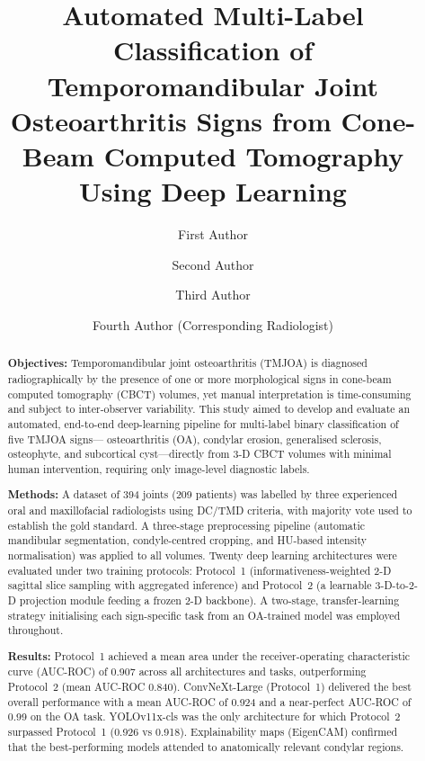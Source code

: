 \documentclass[review,12pt]{elsarticle}
\begin{document}
\begin{frontmatter}

\title{Automated Multi-Label Classification of Temporomandibular Joint
Osteoarthritis Signs from Cone-Beam Computed Tomography Using Deep
Learning}

\author[muid]{First Author}

\author[muid]{Second Author}
\author[muid]{Third Author}
\author[muid]{Fourth Author (Corresponding Radiologist)}


\address[muid]{Department of Oral and Maxillofacial Radiology,
Faculty of Dentistry, Mahidol University, Bangkok, Thailand}

\begin{abstract}
\textbf{Objectives:}
Temporomandibular joint osteoarthritis (TMJOA) is diagnosed
radiographically by the presence of one or more morphological signs in
cone-beam computed tomography (CBCT) volumes, yet manual interpretation
is time-consuming and subject to inter-observer variability. This study
aimed to develop and evaluate an automated, end-to-end deep-learning
pipeline for multi-label binary classification of five TMJOA signs---
osteoarthritis (OA), condylar erosion, generalised sclerosis, osteophyte,
and subcortical cyst---directly from 3-D CBCT volumes with minimal human intervention, requiring only image-level diagnostic labels.

\textbf{Methods:}
A dataset of 394 joints (209 patients) was labelled by three experienced
oral and maxillofacial radiologists using DC/TMD criteria, with majority
vote used to establish the gold standard. A three-stage preprocessing
pipeline (automatic mandibular segmentation, condyle-centred cropping, and
HU-based intensity normalisation) was applied to all volumes. Twenty deep
learning architectures were evaluated under two training protocols:
Protocol~1 (informativeness-weighted 2-D sagittal slice sampling with
aggregated inference) and Protocol~2 (a learnable 3-D-to-2-D projection
module feeding a frozen 2-D backbone). A two-stage, transfer-learning
strategy initialising each sign-specific task from an OA-trained model was
employed throughout.

\textbf{Results:}
Protocol~1 achieved a mean area under the receiver-operating
characteristic curve (AUC-ROC) of 0.907 across all architectures and
tasks, outperforming Protocol~2 (mean AUC-ROC 0.840). ConvNeXt-Large
(Protocol~1) delivered the best overall performance with a mean AUC-ROC
of 0.924 and a near-perfect AUC-ROC of 0.99 on the OA task.
YOLOv11x-cls was the only architecture for which Protocol~2 surpassed
Protocol~1 (0.926 vs 0.918). Explainability maps (EigenCAM) confirmed
that the best-performing models attended to anatomically relevant condylar
regions.


\end{abstract}
\end{frontmatter}
\end{document}

